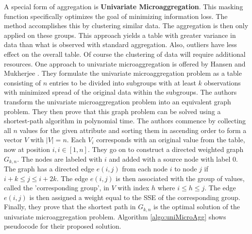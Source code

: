 A special form of aggregation is \textbf{Univariate Microaggregation}. This masking function specifically optimizes the goal of minimizing information loss. The method accomplishes this by clustering similar data. The aggregation is then only applied on these groups. This approach yields a table with greater variance in data than what is observed with standard aggregation. Also, outliers have less effect on the overall table. Of course the clustering of data will require additional resources. One approach to univariate microaggregation is offered by Hansen and Mukherjee \cite{HansenUnivariateMicroaggregation}. They formulate the univariate microaggregation problem as a table consisting of $n$ entries to be divided into subgroups with at least $k$ observations with minimized spread of the original data within the subgroups. The authors transform the univariate microaggregation problem into an equivalent graph problem. They then prove that this graph problem can be solved using a shortest-path algorithm in polynomial time. The authors commence by collecting all $n$ values for the given attribute and sorting them in ascending order to form a vector $V$ with $|V| = n$. Each $V_i$ corresponds with an original value from the table, now at position $i, i \in [1,n]$. They go on to construct a directed weighted graph $G_{k,n}$. The nodes are labeled with $i$ and added with a source node with label $0$. The graph has a directed edge $e(i,j)$ from each node $i$ to node $j$ if $i + k \leq j \le i + 2k$. The edge $e(i,j)$ is then associated with the group of values, called the 'corresponding group', in $V$ with index $h$ where $i \le h \leq j$. The edge $e(i,j)$ is then assigned a weight equal to the \ac{SSE} of the corresponding group. Finally, they prove that the shortest path in $G_{k,n}$ is the optimal solution of the univariate microaggregation problem. Algorithm \ref{algo:uniMicroAgg} shows pseudocode for their proposed solution. 

